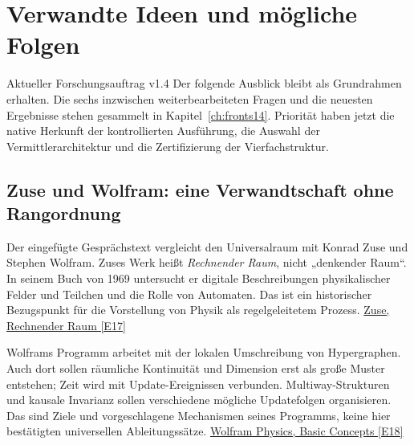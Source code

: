 \chapter{Verwandte Ideen und mögliche Folgen}
\begin{bild}{Aktueller Forschungsauftrag v1.4}
Der folgende Ausblick bleibt als Grundrahmen erhalten. Die sechs inzwischen weiterbearbeiteten Fragen und die neuesten Ergebnisse stehen gesammelt in Kapitel~\ref{ch:fronts14}. Priorität haben jetzt die native Herkunft der kontrollierten Ausführung, die Auswahl der Vermittlerarchitektur und die Zertifizierung der Vierfachstruktur.
\end{bild}
\section{Zuse und Wolfram: eine Verwandtschaft ohne Rangordnung}
Der eingefügte Gesprächstext vergleicht den Universalraum mit Konrad Zuse und Stephen Wolfram. Zuses Werk heißt \emph{Rechnender Raum}, nicht „denkender Raum“. In seinem Buch von 1969 untersucht er digitale Beschreibungen physikalischer Felder und Teilchen und die Rolle von Automaten. Das ist ein historischer Bezugspunkt für die Vorstellung von Physik als regelgeleitetem Prozess. \href{https://link.springer.com/book/10.1007/978-3-663-02723-2}{Zuse, Rechnender Raum [E17]}

Wolframs Programm arbeitet mit der lokalen Umschreibung von Hypergraphen. Auch dort sollen räumliche Kontinuität und Dimension erst als große Muster entstehen; Zeit wird mit Update-Ereignissen verbunden. Multiway-Strukturen und kausale Invarianz sollen verschiedene mögliche Updatefolgen organisieren. Das sind Ziele und vorgeschlagene Mechanismen seines Programms, keine hier bestätigten universellen Ableitungssätze. \href{https://www.wolframphysics.org/technical-introduction/potential-relation-to-physics/basic-concepts/}{Wolfram Physics, Basic Concepts [E18]}

